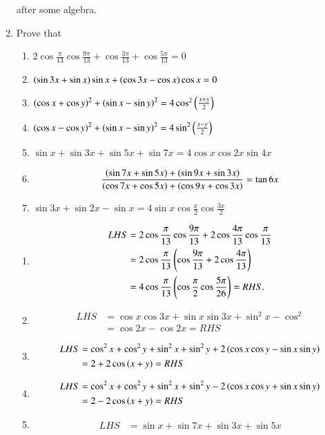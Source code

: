 \begin{enumerate}[label=\thesubsection.\arabic*,ref=\thesubsection.\theenumi,itemsep=1ex]
after some algebra.
%
\item Prove that
\begin{enumerate}
\item 2$\cos\frac{\pi}{13}\cos\frac{9\pi}{13}+\cos\frac{3\pi}{13}+\cos\frac{5\pi}{13}=0$
\item $\left(\sin3x+\sin x\right)\sin x+\left(\cos3x-\cos x\right)\cos x=0$
\item $\left(\cos x+\cos y\right)^{2}+\left(\sin x-\sin y\right)^{2}=4\cos^{2}\left(\frac{x+y}{2}\right)$
\item $\left(\cos x-\cos y\right)^{2}+\left(\sin x-\sin y\right)^{2}=4\sin^{2}\left(\frac{x-y}{2}\right)$
\item $\sin x+\sin3x+\sin5x+\sin7x=4\cos x\cos2x\sin4x$
\item $$\frac{\left(\sin7x+\sin5x\right)+\left(\sin9x+\sin3x\right)}{\left(\cos7x+\cos5x\right)+\left(\cos9x+\cos3x\right)}=\tan6x$$
\item $\sin3x+\sin2x-\sin x=4\sin x\cos\frac{x}{2}\cos\frac{3x}{2}$
\end{enumerate}
%
\solution 
\begin{enumerate}
\item 
\begin{align}
	LHS &= 	2\cos\frac{\pi}{13}\cos\frac{9\pi}{13}+2\cos\frac{4\pi}{13}\cos\frac{\pi}{13}
	\\
	&=
		2\cos\frac{\pi}{13}\left(\cos\frac{9\pi}{13}+2\cos\frac{4\pi}{13}\right)
		\\
		&=
		4\cos\frac{\pi}{13}\left(\cos\frac{\pi}{2}\cos\frac{5\pi}{26}\right)=RHS. 
\end{align}
\item 
\begin{align}
	LHS &= \cos x\cos3x +\sin x\sin3x+ \sin^2 x-\cos^2 
	\\
	 &= \cos 2x - \cos 2x  = RHS
\end{align}
\item 
\begin{align}
	LHS &= \cos^{2} x+\cos^{2} y+\sin ^{2}x+\sin ^{2}y
	+2\left(\cos x\cos y-\sin x\sin y\right)
 \\
	&=2 
	+2\cos\left( x+ y\right) = RHS
\end{align}
\item 
\begin{align}
	LHS &= \cos^{2} x+\cos^{2} y+\sin ^{2}x+\sin ^{2}y
	-2\left(\cos x\cos y+\sin x\sin y\right)
 \\
	&=2 
	-2\cos\left( x+ y\right) = RHS
\end{align}
\item 
\begin{align}
	LHS&=\sin x+\sin7x+\sin3x+\sin5x

\end{align}
\end{enumerate}
\end{enumerate}
